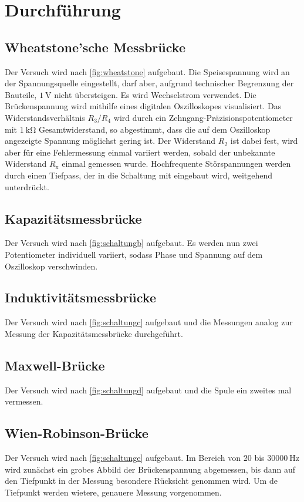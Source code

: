 \section{Durchführung}
\label{sec:Durchführung}

\subsection{Wheatstone'sche  Messbrücke}
Der Versuch wird nach \autoref{fig:wheatstone} aufgebaut. Die Speisespannung wird an der Spannungsquelle eingestellt, 
darf aber, aufgrund technischer Begrenzung der Bauteile, $\SI{1}{\volt}$ nicht übersteigen. Es wird Wechselstrom 
verwendet. Die Brückenspannung wird mithilfe eines digitalen Oszilloskopes visualisiert. Das 
Widerstandsverhältnis $R_3/R_4$ wird durch ein Zehngang-Präzisionspotentiometer mit $\SI{1}{\kilo\ohm}$ Gesamtwiderstand,
so abgestimmt, dass die auf dem Oszilloskop angezeigte Spannung möglichst gering ist. Der Widerstand $R_2$ ist dabei fest, 
wird aber für eine Fehlermessung einmal variiert werden, sobald der unbekannte Widerstand $R_{\text{x}}$ einmal gemessen wurde.
Hochfrequente Störspannungen werden durch einen Tiefpass, der in die Schaltung mit eingebaut wird, weitgehend unterdrückt.

\subsection{Kapazitätsmessbrücke}
Der Versuch wird nach \autoref{fig:schaltungb} aufgebaut. Es werden nun zwei Potentiometer individuell variiert, sodass
Phase und Spannung auf dem Oszilloskop verschwinden. 

\subsection{Induktivitätsmessbrücke}
Der Versuch wird nach \autoref{fig:schaltungc} aufgebaut und die Messungen analog zur Messung der Kapazitätsmessbrücke durchgeführt.

\subsection{Maxwell-Brücke}
Der Versuch wird nach \autoref{fig:schaltungd} aufgebaut und die Spule ein zweites mal vermessen.

\subsection{Wien-Robinson-Brücke}
Der Versuch wird nach \autoref{fig:schaltunge} aufgebaut.
Im Bereich von $20$ bis $\SI{30 000}{\hertz}$ wird zunächst ein grobes Abbild der Brückenspannung abgemessen, bis
dann auf den Tiefpunkt in der Messung besondere Rücksicht genommen wird. Um de Tiefpunkt werden wietere, genauere Messung vorgenommen.